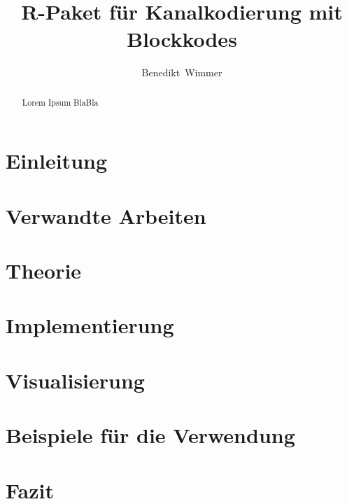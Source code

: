 \documentclass[germanthesis]{thesis-style}
\author{Benedikt~Wimmer}
\title{R-Paket für Kanalkodierung mit Blockkodes}
\begin{document}
\maketitle

\begin{abstract}
Lorem Ipsum BlaBla
\end{abstract}
%

\tableofcontents
{}

\chapter{Einleitung}
\label{chapter:introduction}



\chapter{Verwandte Arbeiten}
\label{chapter:related}

\chapter{Theorie}
\label{chapter:theory}


\chapter{Implementierung}
\label{chapter:implementation}


\chapter{Visualisierung}
\label{chapter:visualization}


\chapter{Beispiele für die Verwendung}
\label{chapter:examples}

\chapter{Fazit}
\label{chapter:conclusion}
\end{document}
